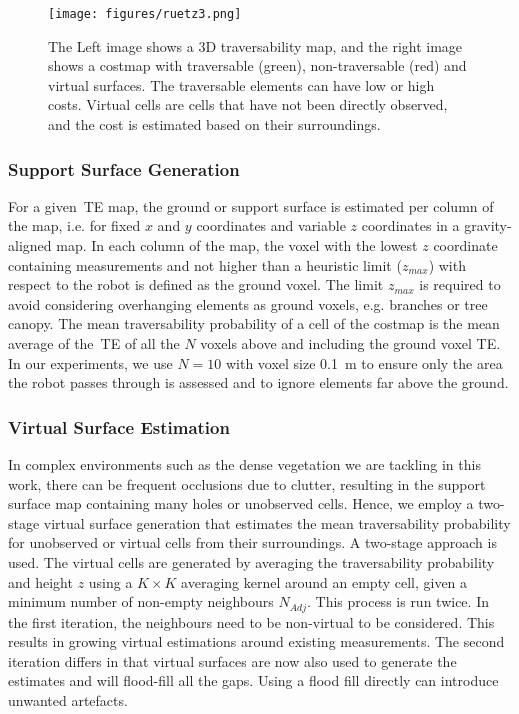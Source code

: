 \begin{figure}[ht]
 \texttt{[image: figures/ruetz3.png]}
 \caption{The Left image shows a 3D traversability map, and the right image shows a costmap with traversable (green), non-traversable (red) and virtual surfaces. The traversable elements can have low or high costs. Virtual cells are cells that have not been directly observed, and the cost is estimated based on their surroundings. }
 \label{fig:costmap_gen}
\end{figure}


\subsubsection{Support Surface Generation}
For a given~\ac{TE} map, the ground or support surface is estimated per column of the map, i.e. for fixed $x$ and $y$ coordinates and variable $z$ coordinates in a gravity-aligned map. In each column of the map, the voxel with the lowest $z$ coordinate containing measurements and not higher than a heuristic limit ($z_{max}$) with respect to the robot is defined as the ground voxel. The limit $z_{max}$ is required to avoid considering overhanging elements as ground voxels, e.g. branches or tree canopy. The mean traversability probability of a cell of the costmap is the mean average of the~\ac{TE} of all the $N$ voxels above and including the ground voxel \ac{TE}. In our experiments, we use $N=10$ with voxel size \qty{0.1}{\m} to ensure only the area the robot passes through is assessed and to ignore elements far above the ground.

\subsubsection{Virtual Surface Estimation}
\label{subsec:virtual_surface_est}
In complex environments such as the dense vegetation we are tackling in this work, there can be frequent occlusions due to clutter, resulting in the support surface map containing many holes or unobserved cells.  Hence, we employ a two-stage virtual surface generation that estimates the mean traversability probability for unobserved or virtual cells from their surroundings. A two-stage approach is used. The virtual cells are generated by averaging the traversability probability and height $z$ using a $K \times K$ averaging kernel around an empty cell, given a minimum number of non-empty neighbours $N_{Adj}$. This process is run twice. In the first iteration,  the neighbours need to be non-virtual to be considered. This results in growing virtual estimations around existing measurements. The second iteration differs in that virtual surfaces are now also used to generate the estimates and will flood-fill all the gaps. Using a flood fill directly can introduce unwanted artefacts.

